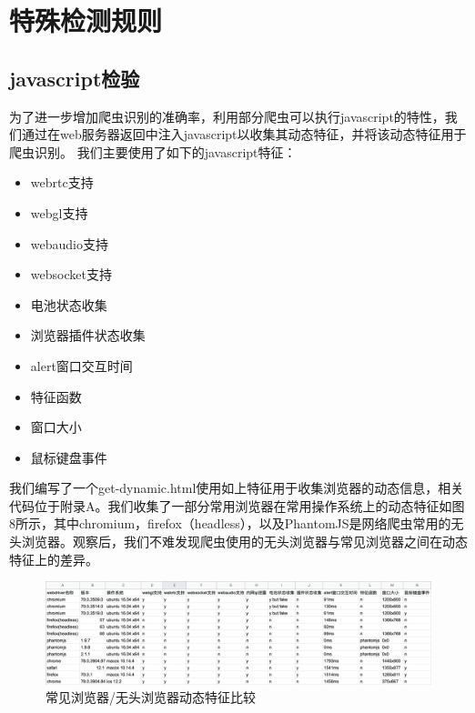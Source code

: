 \documentclass[doctor,privacy,twoside]{buaa_mac}
\begin{document}
\section{特殊检测规则}
\subsection{javascript检验}

为了进一步增加爬虫识别的准确率，利用部分爬虫可以执行javascript的特性，我们通过在web服务器返回中注入javascript以收集其动态特征，并将该动态特征用于爬虫识别。
我们主要使用了如下的javascript特征：

\begin{itemize}
\item webrtc支持
\item webgl支持
\item webaudio支持
\item websocket支持
\item 电池状态收集
\item 浏览器插件状态收集
\item alert窗口交互时间
\item 特征函数
\item 窗口大小
\item 鼠标键盘事件
\end{itemize}

我们编写了一个get-dynamic.html使用如上特征用于收集浏览器的动态信息，相关代码位于附录A。我们收集了一部分常用浏览器在常用操作系统上的动态特征如图8所示，其中chromium，firefox（headless），以及PhantomJS是网络爬虫常用的无头浏览器。观察后，我们不难发现爬虫使用的无头浏览器与常见浏览器之间在动态特征上的差异。

\centerline{}
\begin{figure}[!h]
  \centering
  \includegraphics[width=1\textwidth]{images/dynamic_features.png}
  \caption{常见浏览器/无头浏览器动态特征比较}
  \label{fig:logo}
\end{figure}
\centerline{}
\end{document}
